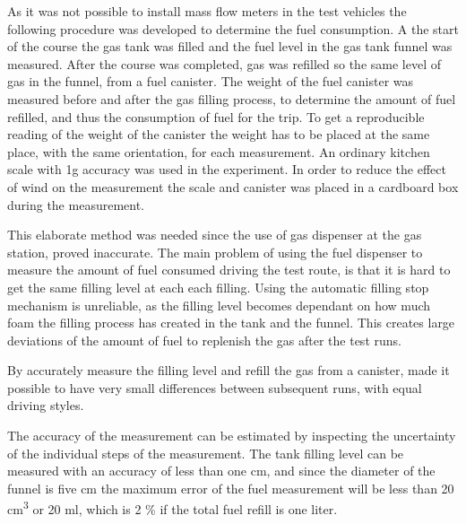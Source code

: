 As it was not possible to install mass flow meters in the test vehicles the following procedure was developed to determine the fuel consumption. A the start of the course the gas tank was filled and  the fuel level in the gas tank funnel was measured. After the course was completed, gas was refilled so the same level of gas in the funnel, from a fuel canister. The weight of the fuel canister was measured before and after the gas filling process, to determine the amount of fuel refilled, and thus the consumption of fuel for the trip. To get a reproducible reading of the weight of the canister the weight has to be placed at the same place, with the same orientation, for each measurement. An ordinary kitchen scale with 1g accuracy was used in the experiment. In order to reduce the effect of wind on the measurement the scale and canister was placed in a cardboard box during the measurement.

This elaborate method was needed since the use of gas dispenser at the gas station, proved inaccurate. The main problem of using the fuel dispenser to measure the amount of fuel consumed driving the test route, is that it is hard to get the same filling level at each each filling. Using the automatic filling stop mechanism is unreliable, as the filling level becomes dependant on how much foam the filling process has created in the tank and the funnel. This creates large deviations of the amount of fuel to replenish the gas after the test runs. 

By accurately measure the filling level and refill the gas from a canister, made it possible to have very small differences between subsequent runs, with equal driving styles. 

The accuracy of the measurement can be estimated by inspecting the uncertainty of the individual steps of the measurement. The tank filling level can be measured with an accuracy of less than one cm, and since the diameter of the funnel is five cm the maximum error of the fuel measurement will be less than 20 cm\textsuperscript{3} or 20 ml, which is 2 \% if the total fuel refill is one liter.
